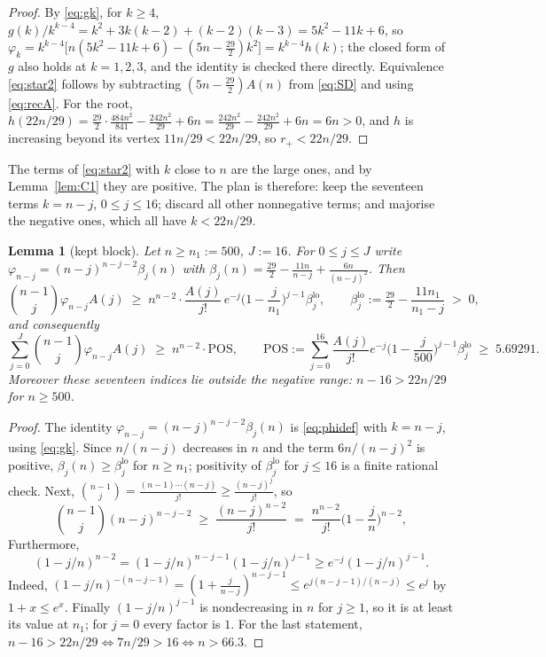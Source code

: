 \documentclass[11pt,a4paper]{amsart}
\theoremstyle{plain}
\newtheorem{lemma}[theorem]{Lemma}
\theoremstyle{definition}
\begin{document}
\begin{proof}
By \eqref{eq:gk}, for $k \ge 4$,
$g(k)/k^{k-4} = k^2+3k(k-2)+(k-2)(k-3) = 5k^2-11k+6$, so
$\varphi_k = k^{k-4}\big[n(5k^2-11k+6)-(5n-\tfrac{29}{2})k^2\big] = k^{k-4}h(k)$;
the closed form of $g$ also holds at $k=1,2,3$, and the identity is checked there
directly. Equivalence \eqref{eq:star2} follows by subtracting
$(5n-\tfrac{29}{2})A(n)$ from \eqref{eq:SD} and using \eqref{eq:recA}. For the
root, $h(22n/29) = \tfrac{29}{2}\cdot\tfrac{484n^2}{841}-\tfrac{242n^2}{29}+6n
= \tfrac{242n^2}{29}-\tfrac{242n^2}{29}+6n = 6n>0$, and $h$ is increasing beyond
its vertex $11n/29 < 22n/29$, so $r_+<22n/29$.
\end{proof}

The terms of \eqref{eq:star2} with $k$ close to $n$ are the large ones, and by
Lemma~\ref{lem:C1} they are positive. The plan is therefore: keep the seventeen
terms $k = n-j$, $0 \le j \le 16$; discard all other nonnegative terms; and
majorise the negative ones, which all have $k < 22n/29$.

\begin{lemma}[kept block]\label{lem:C3}
Let $n \ge n_1 := 500$, $J := 16$. For $0 \le j \le J$ write
$\varphi_{n-j} = (n-j)^{n-j-2}\beta_j(n)$ with
$\beta_j(n) = \tfrac{29}{2}-\frac{11n}{n-j}+\frac{6n}{(n-j)^2}$. Then
\[
  \binom{n-1}{j}\varphi_{n-j}A(j)
  \;\ge\; n^{n-2}\cdot\frac{A(j)}{j!}\,e^{-j}\Big(1-\frac{j}{n_1}\Big)^{j-1}
          \beta^{\mathrm{lo}}_j,
  \qquad
  \beta^{\mathrm{lo}}_j := \tfrac{29}{2}-\frac{11n_1}{n_1-j} \;>\;0 ,
\]
and consequently
\[
  \sum_{j=0}^{J}\binom{n-1}{j}\varphi_{n-j}A(j)
  \;\ge\; n^{n-2}\cdot \mathrm{POS},\qquad
  \mathrm{POS} := \sum_{j=0}^{16}\frac{A(j)}{j!}e^{-j}
                   \Big(1-\frac{j}{500}\Big)^{j-1}\beta^{\mathrm{lo}}_j
  \;\ge\; 5.69291 .
\]
Moreover these seventeen indices lie outside the negative range: $n-16 > 22n/29$
for $n \ge 500$.
\end{lemma}

\begin{proof}
The identity $\varphi_{n-j}=(n-j)^{n-j-2}\beta_j(n)$ is \eqref{eq:phidef} with
$k=n-j$, using \eqref{eq:gk}. Since $n/(n-j)$ decreases in $n$ and the term
$6n/(n-j)^2$ is positive, $\beta_j(n)\ge \beta^{\mathrm{lo}}_j$ for $n \ge n_1$;
positivity of $\beta^{\mathrm{lo}}_j$ for $j \le 16$ is a finite rational check.
Next, $\binom{n-1}{j} = \frac{(n-1)\cdots(n-j)}{j!}\ge\frac{(n-j)^j}{j!}$, so
\[
  \binom{n-1}{j}(n-j)^{n-j-2}
  \;\ge\; \frac{(n-j)^{n-2}}{j!}
  \;=\; \frac{n^{n-2}}{j!}\Big(1-\frac jn\Big)^{n-2},
\]
Furthermore,
\[
  (1-j/n)^{n-2}
  =(1-j/n)^{n-j-1}(1-j/n)^{j-1}
  \ge e^{-j}(1-j/n)^{j-1}.
\]
Indeed, $(1-j/n)^{-(n-j-1)}=(1+\frac{j}{n-j})^{n-j-1}
\le e^{j(n-j-1)/(n-j)}\le e^j$ by $1+x\le e^x$. Finally
$(1-j/n)^{j-1}$ is nondecreasing in $n$ for $j\ge1$, so it is at least its
value at $n_1$; for $j=0$ every factor is $1$.
For the last statement, $n-16>22n/29 \iff 7n/29>16 \iff n>66.3$.
\end{proof}
\end{document}
